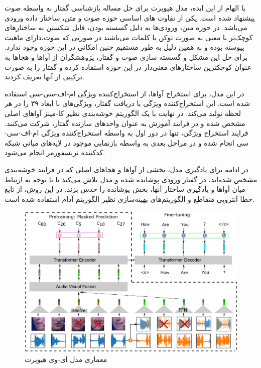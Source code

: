 با الهام از این ایده، مدل هیوبرت
برای حل مساله بازشناسی گفتار به واسطه صوت
پیشنهاد شده است. یکی از تفاوت های اساسی حوزه صوت و متن، ساختار داده ورودی می‌باشد. در حوزه متن، ورودی‌ها به دلیل گسسته بودن، قابل شکستن به ساختار‌های کوچک‌تر با معنی به صورت توکن
یا کلمات می‌باشند در صورتی که صوت،دارای ماهیت پیوسته بوده و به همین دلیل به طور مستقیم چنین امکانی در این حوزه وجود ندارد. برای حل این مشکل و گسسته سازی صوت و گفتار، پژوهشگران از آوا‌ها و هجاها به عنوان کوچکترین ساختار‌های معنی‌دار در این حوزه استفاده کرده و گفتار را به صورت ترکیبی از آنها تعریف کردند. 

در این مدل، برای استخراج آوا‌ها، از استخراج‌کننده ویژگی
ام-اف-سی-سی
استفاده شده است. این استخراج‌کننده ویژگی با دریافت گفتار، ویژگی‌های با ابعاد ۳۹ را در هر لحظه تولید می‌کند. در نهایت با یک الگوریتم خوشه‌بندی نظیر کا-مینز
آواهای اصلی مشخص شده و در فرایند آموزش به عنوان واحد‌های سازنده گفتار، شرکت می‌کنند. فرایند استخراج ویژگی، تنها در دور
اول به واسطه استخراج‌کننده ویژگی ام-اف-سی-سی انجام شده و در مراحل بعدی به واسطه بازنمایی موجود در لایه‌های میانی شبکه کد‌کننده
ترنسفورمر انجام می‌شود.

در ادامه برای یادگیری مدل، بخشی از آواها و هجاهای اصلی که در فرایند خوشه‌بندی مشخص شده‌اند، در گفتار ورودی پوشانده شده و مدل تلاش می‌کند تا با توجه به ارتباط میان آواها و یادگیری ساختار آنها، بخش پوشانده را حدس بزند. در این روش، از تابع خطا آنتروپی متقاطع
و الگوریتم‌های بهینه‌سازی نظیر الگوریتم آدام
استفاده شده است.

\begin{figure}[!h]
	\centering
	\captionsetup{justification=centering}
	\includegraphics[width=\textwidth]{images/av-hubert-model}
	\caption[معماری مدل ای-وی هیوبرت]{معماری مدل ای-وی هیوبرت \cite{shi2022robust}}
	\label{fig:av-hubert-model}
\end{figure}

